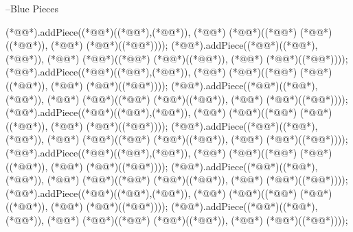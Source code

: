 \begin{vdm_al}
    
    --Blue Pieces
    
    (*@@*).addPiece((*@@*)((*@@*),(*@@*)), (*@@*) (*@@*)((*@@*) (*@@*)((*@@*)), (*@@*) (*@@*)((*@@*))));
    (*@@*).addPiece((*@@*)((*@@*),(*@@*)), (*@@*) (*@@*)((*@@*) (*@@*)((*@@*)), (*@@*) (*@@*)((*@@*))));
    (*@@*).addPiece((*@@*)((*@@*),(*@@*)), (*@@*) (*@@*)((*@@*) (*@@*)((*@@*)), (*@@*) (*@@*)((*@@*))));
    (*@@*).addPiece((*@@*)((*@@*),(*@@*)), (*@@*) (*@@*)((*@@*) (*@@*)((*@@*)), (*@@*) (*@@*)((*@@*))));
    (*@@*).addPiece((*@@*)((*@@*),(*@@*)), (*@@*) (*@@*)((*@@*) (*@@*)((*@@*)), (*@@*) (*@@*)((*@@*))));
    (*@@*).addPiece((*@@*)((*@@*),(*@@*)), (*@@*) (*@@*)((*@@*) (*@@*)((*@@*)), (*@@*) (*@@*)((*@@*))));
    (*@@*).addPiece((*@@*)((*@@*),(*@@*)), (*@@*) (*@@*)((*@@*) (*@@*)((*@@*)), (*@@*) (*@@*)((*@@*))));
    (*@@*).addPiece((*@@*)((*@@*),(*@@*)), (*@@*) (*@@*)((*@@*) (*@@*)((*@@*)), (*@@*) (*@@*)((*@@*))));
    (*@@*).addPiece((*@@*)((*@@*),(*@@*)), (*@@*) (*@@*)((*@@*) (*@@*)((*@@*)), (*@@*) (*@@*)((*@@*))));
    (*@@*).addPiece((*@@*)((*@@*),(*@@*)), (*@@*) (*@@*)((*@@*) (*@@*)((*@@*)), (*@@*) (*@@*)((*@@*))));
    

\end{vdm_al}
